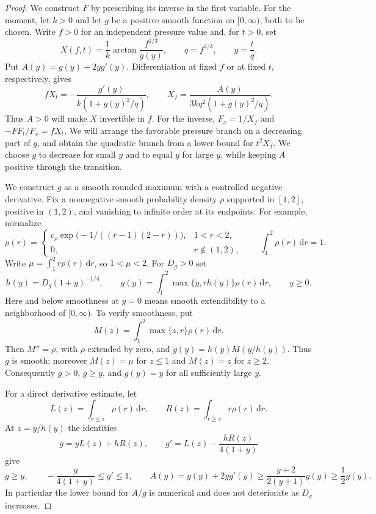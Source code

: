 \documentclass[11pt]{article}
\numberwithin{equation}{section}
\theoremstyle{definition}
\theoremstyle{remark}
\begin{document}
\begin{proof}
We construct $F$ by prescribing its inverse in the first variable. For
the moment, let $k>0$ and let $g$ be a positive smooth function on
$[0,\infty)$, both to be chosen. Write $f>0$ for an independent pressure
value and, for $t>0$, set
\begin{equation}\label{pressure:inverse}
 X(f,t)=\frac1k\arctan\frac{f^{1/3}}{g(y)},\qquad
 q=f^{2/3},\qquad y=\frac tq.
\end{equation}
Put $A(y)=g(y)+2yg'(y)$. Differentiation at fixed $f$ or at fixed $t$,
respectively, gives
\begin{equation}\label{pressure:inverse-derivatives}
 fX_t=-\frac{g'(y)}{k(1+g(y)^2/q)},\qquad
 X_f=\frac{A(y)}{3kq^2(1+g(y)^2/q)}.
\end{equation}
Thus $A>0$ will make $X$ invertible in $f$. For the inverse,
$F_x=1/X_f$ and $-FF_t/F_x=fX_t$. We will arrange the favorable
pressure branch on a decreasing part of $g$, and obtain the quadratic
branch from a lower bound for $t^2X_f$. We choose $g$ to decrease for
small $y$ and to equal $y$ for large $y$, while keeping $A$ positive
through the transition.

We construct $g$ as a smooth rounded maximum with a controlled negative
derivative.  Fix a nonnegative smooth probability density $\rho$ supported
in $[1,2]$, positive in $(1,2)$, and vanishing to infinite order at its
endpoints.  For example, normalize
\[
 \rho(r)=
 \begin{cases}
 c_\rho\exp\bigl(-1/((r-1)(2-r))\bigr),&1<r<2,\\
 0,&r\notin(1,2),
 \end{cases}
 \qquad \int_1^2\rho(r)\,\mathrm d r=1.
\]
Write $\mu=\int_1^2r\rho(r)\,\mathrm d r$, so $1<\mu<2$.  For $D_g>0$ set
\begin{equation}\label{pressure:rounded-max}
 h(y)=D_g(1+y)^{-1/4},\qquad
 g(y)=\int_1^2\max\{y,rh(y)\}\rho(r)\,\mathrm d r,
 \qquad y\ge0.
\end{equation}
Here and below smoothness at $y=0$ means smooth extendibility to a
neighborhood of $[0,\infty)$.  To verify smoothness, put
\[
 M(z)=\int_1^2\max\{z,r\}\rho(r)\,\mathrm d r.
\]
Then $M''=\rho$, with $\rho$ extended by zero, and
$g(y)=h(y)M(y/h(y))$.  Thus $g$ is smooth; moreover $M(z)=\mu$ for
$z\le1$ and $M(z)=z$ for $z\ge2$.  Consequently $g>0$, $g\ge y$, and
$g(y)=y$ for all sufficiently large $y$.

For a direct derivative estimate, let
\[
 L(z)=\int_{r\le z}\rho(r)\,\mathrm d r,
 \qquad R(z)=\int_{r\ge z}r\rho(r)\,\mathrm d r.
\]
At $z=y/h(y)$ the identities
\[
 g=yL(z)+hR(z),\qquad
 g'=L(z)-\frac{hR(z)}{4(1+y)}
\]
give
\begin{equation}\label{pressure:g-bounds}
 g\ge y,\qquad
 -\frac{g}{4(1+y)}\le g'\le1,\qquad
 A(y)=g(y)+2yg'(y)\ge\frac{y+2}{2(y+1)}g(y)\ge\frac12g(y).
\end{equation}
In particular the lower bound for $A/g$ is numerical and does not
deteriorate as $D_g$ increases.


\end{proof}
\end{document}
